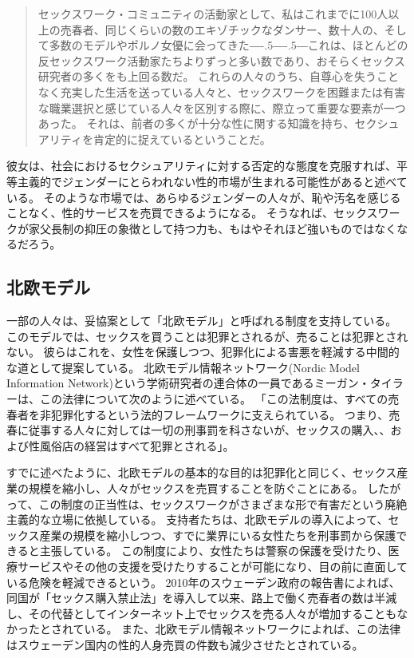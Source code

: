 \documentclass[paper=a4,book,openany]{jlreq}
\def\DDASH{―\kern-.5\zw―\kern-.5\zw―}
\begin{document}
\begin{quote}
セックスワーク・コミュニティの活動家として、私はこれまでに100人以上の売春者、同じくらいの数のエキゾチックなダンサー、数十人の、そして多数のモデルやポルノ女優に会ってきた{\DDASH}これは、ほとんどの反セックスワーク活動家たちよりずっと多い数であり、おそらくセックス研究者の多くをも上回る数だ。
これらの人々のうち、自尊心を失うことなく充実した生活を送っている人々と、セックスワークを困難または有害な職業選択と感じている人々を区別する際に、際立って重要な要素が一つあった。
それは、前者の多くが十分な性に関する知識を持ち、セクシュアリティを肯定的に捉えているということだ。
\citep[pp.128--129]{queen97:_sex_radic_polit_sex_posit}
\end{quote}

彼女は、社会におけるセクシュアリティに対する否定的な態度を克服すれば、平等主義的でジェンダーにとらわれない性的市場が生まれる可能性があると述べている。
そのような市場では、あらゆるジェンダーの人々が、恥や汚名を感じることなく、性的サービスを売買できるようになる。
そうなれば、セックスワークが家父長制の抑圧の象徴として持つ力も、もはやそれほど強いものではなくなるだろう。

\subsection{北欧モデル}

一部の人々は、妥協案として「北欧モデル」と呼ばれる制度を支持している。
このモデルでは、セックスを買うことは犯罪とされるが、売ることは犯罪とされない。
彼らはこれを、女性を保護しつつ、犯罪化による害悪を軽減する中間的な道として提案している。
北欧モデル情報ネットワーク(Nordic Model Information Network)という学術研究者の連合体の一員であるミーガン・タイラーは、この法律について次のように述べている。
「この法制度は、すべての売春者を非犯罪化するという法的フレームワークに支えられている。
つまり、売春に従事する人々に対しては一切の刑事罰を科さないが、セックスの購入、、および性風俗店の経営はすべて犯罪とされる」\citep{woodward16:_calls_austr_adopt_nordic_model_prost}。

すでに述べたように、北欧モデルの基本的な目的は犯罪化と同じく、セックス産業の規模を縮小し、人々がセックスを売買することを防ぐことにある。
したがって、この制度の正当性は、セックスワークがさまざまな形で有害だという廃絶主義的な立場に依拠している。
支持者たちは、北欧モデルの導入によって、セックス産業の規模を縮小しつつ、すでに業界にいる女性たちを刑事罰から保護できると主張している。
この制度により、女性たちは警察の保護を受けたり、医療サービスやその他の支援を受けたりすることが可能になり、目の前に直面している危険を軽減できるという。
2010年のスウェーデン政府の報告書によれば、同国が「セックス購入禁止法」を導入して以来、路上で働く売春者の数は半減し、その代替としてインターネット上でセックスを売る人々が増加することもなかったとされている\citep{sweden10:_repor_sou}。
また、北欧モデル情報ネットワークによれば、この法律はスウェーデン国内の性的人身売買の件数も減少させたとされている\citep[p.25]{commons16:_prost}。
\end{document}
